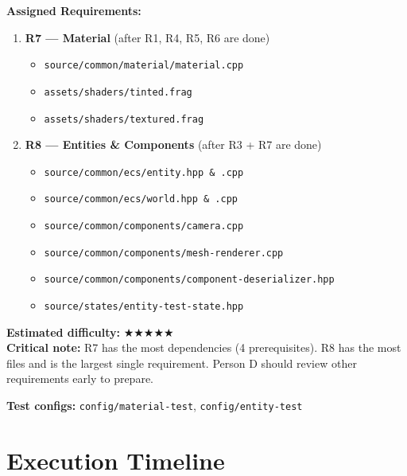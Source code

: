 \documentclass[12pt,a4paper]{article}
\begin{document}
\begin{tcolorbox}[
  colback=personD!8, colframe=personD, title={\textbf{Person D} --- Material + Entities \& Components (ECS)},
  fonttitle=\bfseries\color{white}, coltitle=white
]
\textbf{Assigned Requirements:}
\begin{enumerate}[nosep]
  \item \textbf{R7 --- Material} (after R1, R4, R5, R6 are done)
    \begin{itemize}[nosep]
      \item \texttt{source/common/material/material.cpp}
      \item \texttt{assets/shaders/tinted.frag}
      \item \texttt{assets/shaders/textured.frag}
    \end{itemize}
  \item \textbf{R8 --- Entities \& Components} (after R3 + R7 are done)
    \begin{itemize}[nosep]
      \item \texttt{source/common/ecs/entity.hpp \& .cpp}
      \item \texttt{source/common/ecs/world.hpp \& .cpp}
      \item \texttt{source/common/components/camera.cpp}
      \item \texttt{source/common/components/mesh-renderer.cpp}
      \item \texttt{source/common/components/component-deserializer.hpp}
      \item \texttt{source/states/entity-test-state.hpp}
    \end{itemize}
\end{enumerate}

\textbf{Estimated difficulty:} {\Large$\bigstar\bigstar\bigstar\bigstar\bigstar$} \\
\textbf{Critical note:} R7 has the most dependencies (4 prerequisites). R8 has the most files and is the largest single requirement. Person D should review other requirements early to prepare.

\textbf{Test configs:} \texttt{config/material-test}, \texttt{config/entity-test}
\end{tcolorbox}

\section{Execution Timeline}
\end{document}
